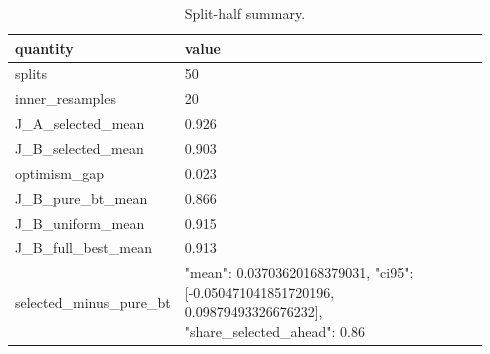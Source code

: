 \begin{table}[htbp]
\centering\scriptsize
\caption{Split-half summary.}
\label{tab:split_half_summary}
\setlength{\tabcolsep}{3pt}
\begin{tabular}{p{0.154\linewidth}p{0.788\linewidth}}
\toprule
quantity & value \\
\midrule
splits & 50 \\
inner\_\allowbreak{}resamples & 20 \\
J\_\allowbreak{}A\_\allowbreak{}selected\_\allowbreak{}mean & 0.926 \\
J\_\allowbreak{}B\_\allowbreak{}selected\_\allowbreak{}mean & 0.903 \\
optimism\_\allowbreak{}gap & 0.023 \\
J\_\allowbreak{}B\_\allowbreak{}pure\_\allowbreak{}bt\_\allowbreak{}mean & 0.866 \\
J\_\allowbreak{}B\_\allowbreak{}uniform\_\allowbreak{}mean & 0.915 \\
J\_\allowbreak{}B\_\allowbreak{}full\_\allowbreak{}best\_\allowbreak{}mean & 0.913 \\
selected\_\allowbreak{}minus\_\allowbreak{}pure\_\allowbreak{}bt & {"mean": 0.03703620168379031, "ci95": [-0.050471041851720196, 0.09879493326676232], "share\_\allowbreak{}selected\_\allowbreak{}ahead": 0.86} \\
\bottomrule
\end{tabular}
\end{table}
